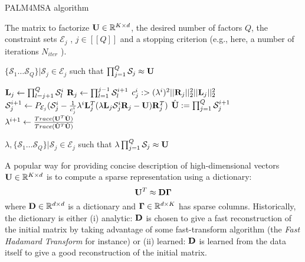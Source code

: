 \begin{algorithm}
	\caption{PALM4MSA algorithm}
	\label{algo:palm4msa}
	\begin{algorithmic}[1]
		
		
		\REQUIRE The matrix to factorize ${\mathbf{U}} \in \mathbb{R}^{K \times d}$, the desired number of factors $Q$, the constraint sets $\mathcal{E}_j$ , $j \in [\![Q]\!]$ and a stopping criterion (e.g., here, a number of iterations $N_{iter}$ ).
		
		\ENSURE $\{\mathcal{S}_1 \dots \mathcal{S}_{Q}\}|\mathcal{S}_j \in \mathcal{E}_j$ such that $\prod_{j=1}^{Q}\mathcal{S}_j \approx {\mathbf{U}}$
		
		\STATE  ${\mathbf{L}}_j \leftarrow \prod_{l=j+1}^{Q} \mathcal{S}_{l}^{i}$
		\STATE  ${\mathbf{R}}_j \leftarrow \prod_{l=1}^{j-1} \mathcal{S}_{l}^{i+1}$
		\STATE $c_j^i :> (\lambda^i)^2 ||{\mathbf{R}}_j||_2^2 ||{\mathbf{L}}_j||_2^2$
		\STATE $\mathcal{S}^{i+1}_j \leftarrow P_{\mathcal{E}_j}(\mathcal{S}_j^i - \frac{1}{c_j^i} \lambda^i {\mathbf{L}}_j^T(\lambda {\mathbf{L}}_j \mathcal{S}_j^i {\mathbf{R}}_j - {\mathbf{U}}){\mathbf{R}}_j^T)$
		\ENDFOR
		\STATE $\hat {{\mathbf{U}}} := \prod_{j=1}^{Q} \mathcal{S}_j^{i+1}$
		\STATE $\lambda^{i+1} \leftarrow \frac{Trace({\mathbf{U}}^T\hat{{\mathbf{U}}})}{Trace(\hat{{\mathbf{U}}}^T\hat{{\mathbf{U}}})}$
		\ENDFOR
		
		\ENSURE $\lambda, \{\mathcal{S}_1 \dots \mathcal{S}_{Q}\}|\mathcal{S}_j \in \mathcal{E}_j$ such that $\lambda \prod_{j=1}^{Q}\mathcal{S}_j \approx {\mathbf{U}}$
		
	\end{algorithmic}
\end{algorithm}



A popular way for providing concise description of high-dimensional vectors ${\mathbf{U}} \in \mathbb{R}^{K \times d}$ is to compute a sparse representation using a dictionary:
%
\begin{equation}
{\mathbf{U}}^T \approx {\mathbf{D}}{\mathbf{\Gamma}}
\end{equation}
%
where ${\mathbf{D}} \in \mathbb{R}^{d \times d}$ is a dictionary and ${\mathbf{\Gamma}} \in \mathbb{R}^{d \times K}$ has sparse columns. Historically, the dictionary is either (i) analytic: ${\mathbf{D}}$ is chosen to give a fast reconstruction of the initial matrix by taking advantage of some fast-transform algorithm (the \textit{Fast Hadamard Transform} for instance) or (ii) learned: ${\mathbf{D}}$ is learned from the data itself to give a good reconstruction of the initial matrix.

